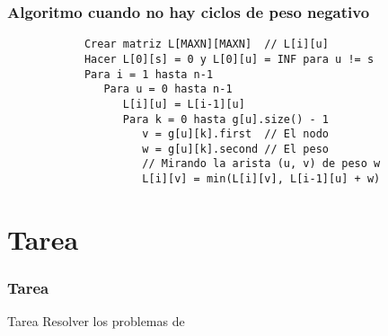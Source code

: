 \documentclass{beamer}
\begin{document}
	\begin{frame}[fragile]
		\frametitle{Algoritmo cuando no hay ciclos de peso negativo}
		\begin{lstlisting}
			Crear matriz L[MAXN][MAXN]  // L[i][u]
			Hacer L[0][s] = 0 y L[0][u] = INF para u != s
			Para i = 1 hasta n-1
			   Para u = 0 hasta n-1
			      L[i][u] = L[i-1][u]
			      Para k = 0 hasta g[u].size() - 1
			         v = g[u][k].first  // El nodo
			         w = g[u][k].second // El peso
			         // Mirando la arista (u, v) de peso w
			         L[i][v] = min(L[i][v], L[i-1][u] + w)
		\end{lstlisting}
	\end{frame}
	
	

\section{Tarea}
	\begin{frame}[fragile]
		\frametitle{Tarea}
		\begin{alertblock}{Tarea}
			Resolver los problemas de \url{}
		\end{alertblock}
	\end{frame}
\end{document}
